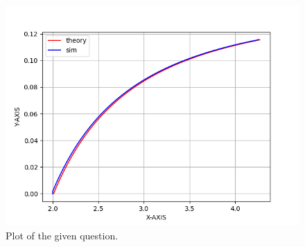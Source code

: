 \documentclass[journal]{IEEEtran}
\begin{document}
\begin{enumerate}
\begin{figure}[h]
			\includegraphics[width=\columnwidth]{figs/fig.png}
			\caption{Plot of the given question.}
			\label{fig:Plot1} 
		\end{figure}
\end{enumerate}
\end{document}
